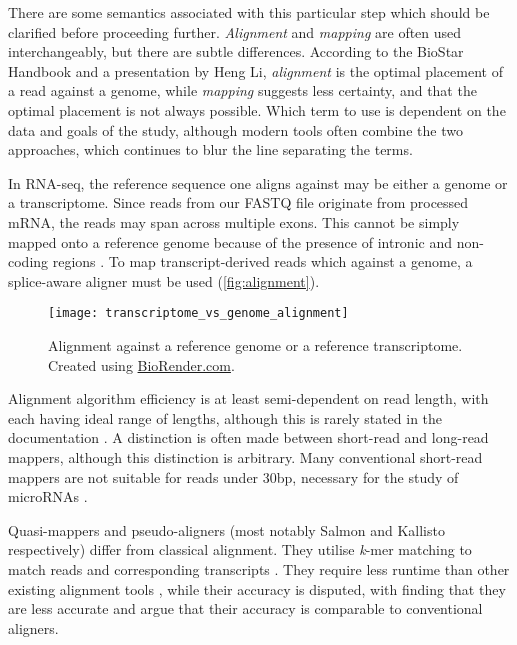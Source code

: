 There are some semantics associated with this particular step which should be clarified before proceeding further. \textit{Alignment} and \textit{mapping} are often used interchangeably, but there are subtle differences. According to the BioStar Handbook \citep{albert2020biostar} and a presentation by Heng Li, \textit{alignment} is the optimal placement of a read against a genome, while \textit{mapping} suggests less certainty, and that the optimal placement is not always possible. Which term to use is dependent on the data and goals of the study, although modern tools often combine the two approaches, which continues to blur the line separating the terms.

In RNA-seq, the reference sequence one aligns against may be either a genome or a transcriptome. Since reads from our FASTQ file originate from processed mRNA, the reads may span across multiple exons. This cannot be simply mapped onto a reference genome because of the presence of intronic and non-coding regions \citep{rnadataanalysis2020}. To map transcript-derived reads which against a genome, a splice-aware aligner must be used (\autoref{fig:alignment}).

\begin{figure}[!ht]
    \centering
    \texttt{[image: transcriptome\_vs\_genome\_alignment]}
    \caption[Alignment against a reference genome or a reference transcriptome]{Alignment against a reference genome or a reference transcriptome. Created using \href{https://biorender.com/}{BioRender.com}. } 
    \label{fig:alignment}
\end{figure}
\clearpage

Alignment algorithm efficiency is at least semi-dependent on read length, with each having ideal range of lengths, although this is rarely stated in the documentation \citep{albert2020biostar}. A distinction is often made between short-read and long-read mappers, although this distinction is arbitrary. Many conventional short-read mappers are not suitable for reads under 30bp, necessary for the study of microRNAs \citep{albert2020biostar, ziemann2016evaluation}.

Quasi-mappers and pseudo-aligners (most notably Salmon \citep{patro2017salmon} and Kallisto \citep{bray2016near} respectively) differ from classical alignment. They utilise \textit{k}-mer matching to match reads and corresponding transcripts \citep{rnadataanalysis2020}. They require less runtime than other existing alignment tools \citep{Zhang2017}, while their accuracy is disputed, with \cite{srivastava2020alignment} finding that they are less accurate and \cite{Zhang2017, Schaarschmidt2020} argue that their accuracy is comparable to conventional aligners.

